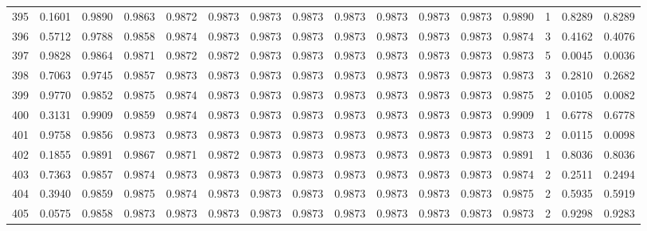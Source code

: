 \begin{tabular}{lrrrrrrrrrrrrrrr}
395 &      0.1601 &  0.9890 &  0.9863 &  0.9872 &  0.9873 &  0.9873 &  0.9873 &  0.9873 &  0.9873 &  0.9873 &   0.9873 &     0.9890 &      1 &                    0.8289 &                     0.8289 \\
396 &      0.5712 &  0.9788 &  0.9858 &  0.9874 &  0.9873 &  0.9873 &  0.9873 &  0.9873 &  0.9873 &  0.9873 &   0.9873 &     0.9874 &      3 &                    0.4162 &                     0.4076 \\
397 &      0.9828 &  0.9864 &  0.9871 &  0.9872 &  0.9872 &  0.9873 &  0.9873 &  0.9873 &  0.9873 &  0.9873 &   0.9873 &     0.9873 &      5 &                    0.0045 &                     0.0036 \\
398 &      0.7063 &  0.9745 &  0.9857 &  0.9873 &  0.9873 &  0.9873 &  0.9873 &  0.9873 &  0.9873 &  0.9873 &   0.9873 &     0.9873 &      3 &                    0.2810 &                     0.2682 \\
399 &      0.9770 &  0.9852 &  0.9875 &  0.9874 &  0.9873 &  0.9873 &  0.9873 &  0.9873 &  0.9873 &  0.9873 &   0.9873 &     0.9875 &      2 &                    0.0105 &                     0.0082 \\
400 &      0.3131 &  0.9909 &  0.9859 &  0.9874 &  0.9873 &  0.9873 &  0.9873 &  0.9873 &  0.9873 &  0.9873 &   0.9873 &     0.9909 &      1 &                    0.6778 &                     0.6778 \\
401 &      0.9758 &  0.9856 &  0.9873 &  0.9873 &  0.9873 &  0.9873 &  0.9873 &  0.9873 &  0.9873 &  0.9873 &   0.9873 &     0.9873 &      2 &                    0.0115 &                     0.0098 \\
402 &      0.1855 &  0.9891 &  0.9867 &  0.9871 &  0.9872 &  0.9873 &  0.9873 &  0.9873 &  0.9873 &  0.9873 &   0.9873 &     0.9891 &      1 &                    0.8036 &                     0.8036 \\
403 &      0.7363 &  0.9857 &  0.9874 &  0.9873 &  0.9873 &  0.9873 &  0.9873 &  0.9873 &  0.9873 &  0.9873 &   0.9873 &     0.9874 &      2 &                    0.2511 &                     0.2494 \\
404 &      0.3940 &  0.9859 &  0.9875 &  0.9874 &  0.9873 &  0.9873 &  0.9873 &  0.9873 &  0.9873 &  0.9873 &   0.9873 &     0.9875 &      2 &                    0.5935 &                     0.5919 \\
405 &      0.0575 &  0.9858 &  0.9873 &  0.9873 &  0.9873 &  0.9873 &  0.9873 &  0.9873 &  0.9873 &  0.9873 &   0.9873 &     0.9873 &      2 &                    0.9298 &                     0.9283 \\

\end{tabular}
